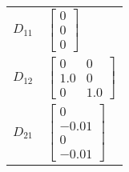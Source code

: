 \begin{tabular}{cl}
 $D_{11}$ & $\left[\begin{matrix}0\\0\\0\end{matrix}\right]$                                                                                                                                               \\
 $D_{12}$ & $\left[\begin{matrix}0 & 0\\1.0 & 0\\0 & 1.0\end{matrix}\right]$                                                                                                                               \\
 $D_{21}$ & $\left[\begin{matrix}0\\-0.01\\0\\-0.01\end{matrix}\right]$                                                                                                                                    \\
\hline
\end{tabular}